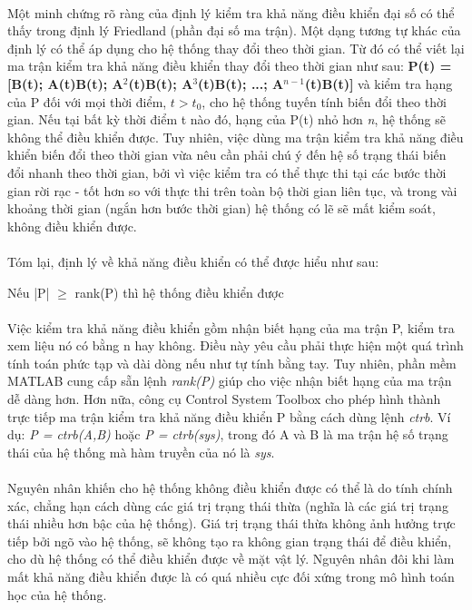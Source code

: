 \paragraph{}Một minh chứng rõ ràng của định lý kiểm tra khả năng điều khiển đại số có thể thấy trong định lý Friedland (phần đại số ma trận). Một dạng tương tự khác của định lý có thể áp dụng cho hệ thống thay đổi theo thời gian. Từ đó có thể viết lại ma trận kiểm tra khả năng điều khiển thay đổi theo thời gian như sau: \textbf{P(t) = [B(t); A(t)B(t); A$^{2}$(t)B(t); A$^{3}$(t)B(t); ...; A$^{n-1}$(t)B(t)]} và kiểm tra hạng của P đối với mọi thời điểm, $t>t_{0}$, cho hệ thống tuyến tính biến đổi theo thời gian. Nếu tại bất kỳ thời điểm t nào đó, hạng của P(t) nhỏ hơn \textit{n}, hệ thống sẽ không thể điều khiển được. Tuy nhiên, việc dùng ma trận kiểm tra khả năng điều khiển biến đổi theo thời gian vừa nêu cần phải chú ý đến hệ số trạng thái biến đổi nhanh theo thời gian, bởi vì việc kiểm tra có thể thực thi tại các bước thời gian rời rạc - tốt hơn so với thực thi trên toàn bộ thời gian liên tục, và trong vài khoảng thời gian (ngắn hơn bước thời gian) hệ thống có lẽ sẽ mất kiểm soát, không điều khiển được. 
\paragraph{}Tóm lại, định lý về khả năng điều khiển có thể được hiểu như sau:
\begin{center}
	Nếu |P| $\geq$ rank(P) thì hệ thống điều khiển được
\end{center}
\paragraph{}Việc kiểm tra khả năng điều khiển gồm nhận biết hạng của ma trận P, kiểm tra xem liệu nó có bằng n hay không. Điều này yêu cầu phải thực hiện một quá trình tính toán phức tạp và dài dòng nếu như tự tính bằng tay. Tuy nhiên, phần mềm MATLAB cung cấp sẵn lệnh \textit{rank(P)} giúp cho việc nhận biết hạng của ma trận dễ dàng hơn. Hơn nữa, công cụ Control System Toolbox cho phép hình thành trực tiếp ma trận kiểm tra khả năng điều khiển P bằng cách dùng lệnh \textit{ctrb}. Ví dụ: \textit{P = ctrb(A,B)} hoặc \textit{P = ctrb(sys)}, trong đó A và B là ma trận hệ số trạng thái của hệ thống mà hàm truyền của nó là \textit{sys}.
\paragraph{}Nguyên nhân khiến cho hệ thống không điều khiển được có thể là do tính chính xác, chẳng hạn cách dùng các giá trị trạng thái thừa (nghĩa là các giá trị trạng thái nhiều hơn bậc của hệ thống). Giá trị trạng thái thừa không ảnh hưởng trực tiếp bởi ngõ vào hệ thống, sẽ không tạo ra không gian trạng thái để điều khiển, cho dù hệ thống có thể điều khiển được về mặt vật lý. Nguyên nhân đôi khi làm mất khả năng điều khiển được là có quá nhiều cực đối xứng trong mô hình toán học của hệ thống. 
